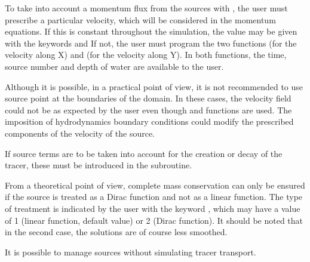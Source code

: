 To take into account a momentum flux from the sources with , the
user must prescribe a particular velocity, which will be considered in the
momentum equations.  If this is constant throughout the simulation, the value
may be given with the keywords  and
 If not, the user must program the
two functions  (for the velocity along X) and 
(for the velocity along Y). In both functions, the time, source number and
depth of water are available to the user.

Although it is possible, in a practical point of view, it is not recommended
to use source point at the boundaries of the domain. In these cases, the
velocity field could not be as expected by the user even though 
and  functions are used. The imposition of hydrodynamics
boundary conditions could modify the prescribed components of the velocity of
the source.

If source terms are to be taken into account for the creation or decay of the
tracer, these must be introduced in the  subroutine.

From a theoretical point of view, complete mass conservation can only be
ensured if the source is treated as a Dirac function and not as a linear
function. The type of treatment is indicated by the user with the keyword
, which may have a value of 1 (linear function, default
value) or 2 (Dirac function). It should be noted that in the second case, the
solutions are of course less smoothed.

It is possible to manage sources without simulating tracer transport.


